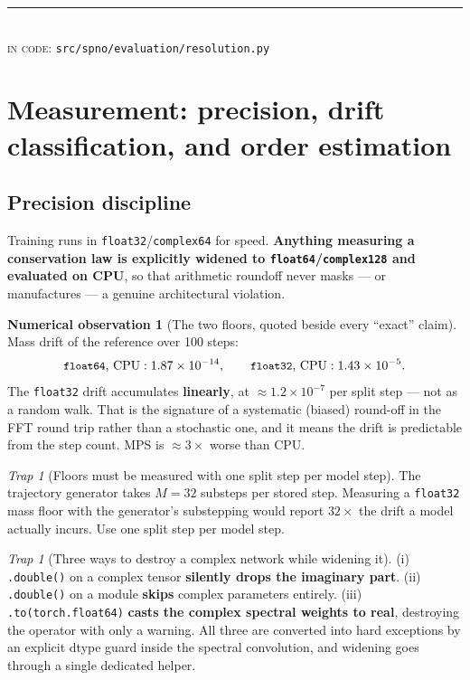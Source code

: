 \documentclass[11pt,a4paper]{article}
\theoremstyle{plain}
\theoremstyle{definition}
\newtheorem{observation}[theorem]{Numerical observation}
\theoremstyle{remark}
\newtheorem{trap}[theorem]{Trap}
\newcommand{\code}[1]{\texttt{\small #1}}
\newcommand{\src}[1]{{\color{linknavy}\texttt{\footnotesize #1}}}
\newcommand{\sourcenote}[1]{%
  \par\vspace{0.35em}\noindent
  {\footnotesize\color{rulegray}\rule{\linewidth}{0.4pt}\\[0.25em]
  \textsc{in code:} \src{#1}}\par\vspace{0.5em}}
\begin{document}
\sourcenote{src/spno/evaluation/resolution.py}

\section{Measurement: precision, drift classification, and order estimation}
\label{sec:measurement}

\subsection{Precision discipline}

Training runs in \code{float32}/\code{complex64} for speed. \textbf{Anything measuring a
conservation law is explicitly widened to \code{float64}/\code{complex128} and evaluated
on CPU}, so that arithmetic roundoff never masks --- or manufactures --- a genuine
architectural violation.

\begin{observation}[The two floors, quoted beside every ``exact'' claim]
\label{obs:floors}
Mass drift of the reference over 100 steps:
\[
\text{\code{float64}, CPU}: 1.87\times10^{-14},
\qquad
\text{\code{float32}, CPU}: 1.43\times10^{-5}.
\]
The \code{float32} drift accumulates \textbf{linearly}, at $\approx1.2\times10^{-7}$ per
split step --- not as a random walk. That is the signature of a systematic (biased)
round-off in the FFT round trip rather than a stochastic one, and it means the drift is
predictable from the step count. MPS is $\approx3\times$ worse than CPU.
\end{observation}

\begin{trap}[Floors must be measured with one split step per model step]
The trajectory generator takes $M=32$ substeps per stored step. Measuring a
\code{float32} mass floor with the generator's substepping would report $32\times$ the
drift a model actually incurs. Use one split step per model step.
\end{trap}

\begin{trap}[Three ways to destroy a complex network while widening it]
\label{trap:widen}
(i) \code{.double()} on a complex tensor \textbf{silently drops the imaginary part}.
(ii) \code{.double()} on a module \textbf{skips} complex parameters entirely.
(iii) \code{.to(torch.float64)} \textbf{casts the complex spectral weights to real},
destroying the operator with only a warning. All three are converted into hard exceptions
by an explicit dtype guard inside the spectral convolution, and widening goes through a
single dedicated helper.
\end{trap}
\end{document}
